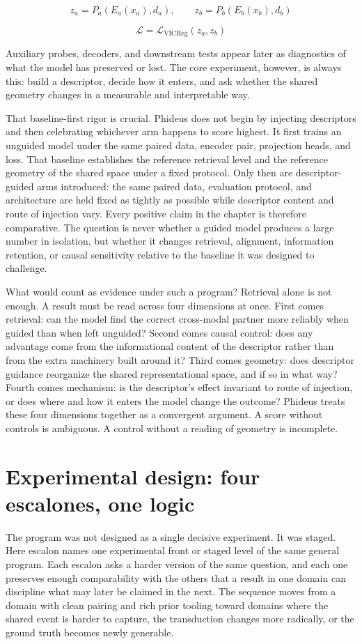 $$
z_a = P_a(E_a(x_a), d_a), \qquad z_b = P_b(E_b(x_b), d_b)
$$

$$
\mathcal{L} = \mathcal{L}_{\mathrm{VICReg}}(z_a, z_b)
$$

Auxiliary probes, decoders, and downstream tests appear later as diagnostics of what the model has preserved or lost. The core experiment, however, is always this: build a descriptor, decide how it enters, and ask whether the shared geometry changes in a measurable and interpretable way.

That baseline-first rigor is crucial. Phideus does not begin by injecting descriptors and then celebrating whichever arm happens to score highest. It first trains an unguided model under the same paired data, encoder pair, projection heads, and loss. That baseline establishes the reference retrieval level and the reference geometry of the shared space under a fixed protocol. Only then are descriptor-guided arms introduced: the same paired data, evaluation protocol, and architecture are held fixed as tightly as possible while descriptor content and route of injection vary. Every positive claim in the chapter is therefore comparative. The question is never whether a guided model produces a large number in isolation, but whether it changes retrieval, alignment, information retention, or causal sensitivity relative to the baseline it was designed to challenge.

What would count as evidence under such a program? Retrieval alone is not enough. A result must be read across four dimensions at once. First comes retrieval: can the model find the correct cross-modal partner more reliably when guided than when left unguided? Second comes causal control: does any advantage come from the informational content of the descriptor rather than from the extra machinery built around it? Third comes geometry: does descriptor guidance reorganize the shared representational space, and if so in what way? Fourth comes mechanism: is the descriptor's effect invariant to route of injection, or does where and how it enters the model change the outcome? Phideus treats these four dimensions together as a convergent argument. A score without controls is ambiguous. A control without a reading of geometry is incomplete.


\section{Experimental design: four escalones, one logic}


The program was not designed as a single decisive experiment. It was staged. Here escalon names one experimental front or staged level of the same general program. Each escalon asks a harder version of the same question, and each one preserves enough comparability with the others that a result in one domain can discipline what may later be claimed in the next. The sequence moves from a domain with clean pairing and rich prior tooling toward domains where the shared event is harder to capture, the transduction changes more radically, or the ground truth becomes newly generable.

